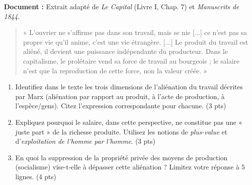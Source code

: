 \documentclass[11pt]{article}
\begin{document}
\begin{exercice}
\textbf{Document :} Extrait adapté de \textit{Le Capital} (Livre I, Chap. 7) et \textit{Manuscrits de 1844}.
\begin{quote}
« L'ouvrier ne s'affirme pas dans son travail, mais se nie [...] ce n'est pas sa propre vie qu'il anime, c'est une vie étrangère. [...] Le produit du travail est aliéné, il devient une puissance indépendante du producteur. Dans le capitalisme, le prolétaire vend sa force de travail au bourgeois ; le salaire n'est que la reproduction de cette force, non la valeur créée. »
\end{quote}
\begin{enumerate}
    \item Identifiez dans le texte les trois dimensions de l'aliénation du travail décrites par Marx (aliénation par rapport au produit, à l'acte de production, à l'espèce/gens). Citez l'expression correspondante pour chacune. (3 pts)
    \item Expliquez pourquoi le salaire, dans cette perspective, ne constitue pas une « juste part » de la richesse produite. Utilisez les notions de \textit{plus-value} et d'\textit{exploitation de l'homme par l'homme}. (3 pts)
    \item En quoi la suppression de la propriété privée des moyens de production (socialisme) vise-t-elle à dépasser cette aliénation ? Limitez votre réponse à 5 lignes. (4 pts)
\end{enumerate}
\end{exercice}
\end{document}
